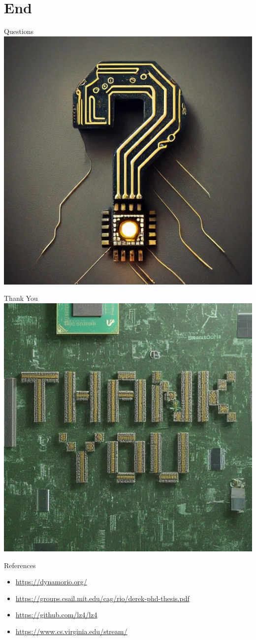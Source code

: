 \documentclass[aspectratio=169]{beamer}
\begin{document}
\section*{End}
\begin{frame}{Questions}
    \centering
    \includegraphics[width=.4\linewidth]{Q.jpg}
\end{frame}
\begin{frame}{Thank You}
    \centering
    \includegraphics[width=.4\linewidth]{Tq.jpg}
\end{frame}

\begin{frame}{References}
    \begin{itemize}
        \item \url{https://dynamorio.org/}
        \item \url{https://groups.csail.mit.edu/cag/rio/derek-phd-thesis.pdf}
        \item \url{https://github.com/lz4/lz4}
        \item \url{https://www.cs.virginia.edu/stream/}
    \end{itemize}
\end{frame}
\end{document}
